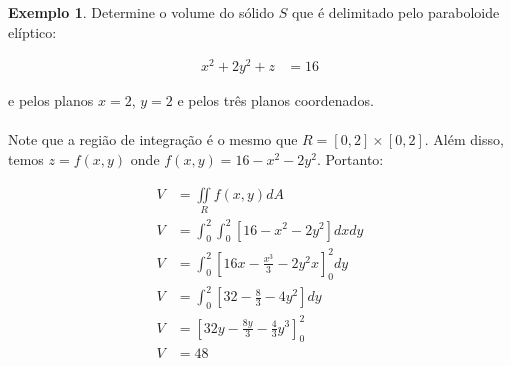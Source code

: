 \documentclass{article}
\newcommand{\doubleint}[1] {\iint\limits_R #1 dA}
\theoremstyle{definition}
\newtheorem{example}{Exemplo}[section]
\begin{document}
        \begin{example}
            Determine o volume do sólido $S$ que é delimitado pelo paraboloide
            elíptico:

            \begin{align*}
                x^2 + 2y^2 + z &= 16
            \end{align*}

            e pelos planos $x = 2$, $y = 2$ e pelos três planos coordenados.

            \paragraph{}
            Note que a região de integração é o mesmo que $R = [0,2] \times [0,2]$.
            Além disso, temos $z = f(x,y)$ onde $f(x,y) = 16 - x^2 - 2y^2$. Portanto:

            \begin{align*}
                V &= \doubleint{f(x,y)}\\
                V &= \int_0^2 \int_0^2 [16 - x^2 - 2y^2] dx dy\\
                V &= \int_0^2 \left[ 16x - \frac{x^3}{3} - 2y^2x \right]_0^2 dy\\
                V &= \int_0^2 \left[ 32 - \frac{8}{3} - 4y^2 \right] dy\\
                V &= \left[ 32y - \frac{8y}{3} - \frac{4}{3} y^3 \right]_0^2\\
                V &= 48
            \end{align*}
        \end{example}
\end{document}
